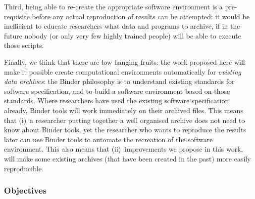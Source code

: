 Third, being able to re-create the appropriate software environment is a
pre-requisite before any actual reproduction of results can be attempted: it
would be inefficient to educate researchers what data and programs to archive,
if in the future nobody (or only very few highly trained people) will be able to
execute those scripts.

Finally, we think that there are low hanging fruits: the work proposed here will
make it possible create computational environments automatically for
\emph{existing data archives}: the Binder philosophy is to understand existing standards for software
specification, and to build a software environment based on those standards.
Where researchers have used the existing software specification already, Binder tools
will work immediately on their archived files. This means that (i)~a researcher
putting together a well organised archive does not need to know about Binder tools,
yet the researcher who wants to reproduce the results later can use Binder tools to
automate the recreation of the software environment. This also means that
(ii)~improvements we propose in this work, will make some existing archives (that
have been created in the past) more easily reproducible.


\subsubsection{Objectives}\label{sect:objectives}


